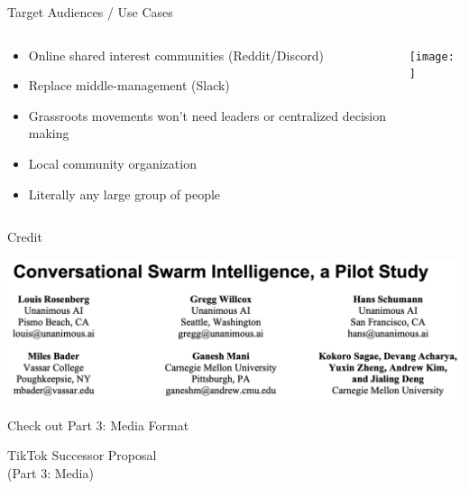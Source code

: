 \documentclass[aspectratio=169]{beamer}
\begin{document}
\begin{frame}{Target Audiences / Use Cases}
\begin{columns}[T]
    \begin{column}[T]{0.5\textwidth}
        \begin{itemize}
            \item Online shared interest communities (Reddit/Discord)
            \item Replace middle-management (Slack)
            \item Grassroots movements won't need leaders or centralized decision making
            \item Local community organization
            \item Literally any large group of people
        \end{itemize}
    \end{column}
    \begin{column}{0.5\textwidth}
        \texttt{[image: ]}
    \end{column}
\end{columns}
\end{frame}

\begin{frame}{Credit}
\vspace{-0.5in}
\begin{center}
\includegraphics[width=\textwidth]{imgs/CSI_section/authors.png}
\end{center}
\end{frame}

\begin{frame}{Check out Part 3: Media Format}
\end{frame}

\begin{frame}
    \centering
    \Huge TikTok Successor Proposal \\
    \Huge (Part 3: Media)
\end{frame}
\end{document}

